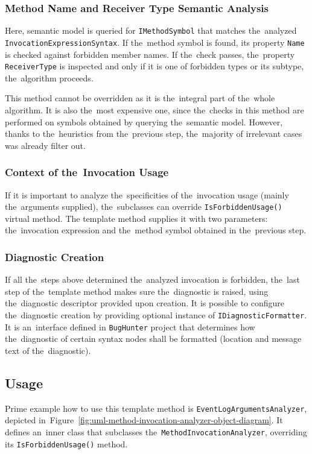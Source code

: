 \documentclass[
  digital, %
  table,   %
  lof,     %
  lot,     %
  oneside,
]{fithesis3}
\begin{document}

\subsubsection{Method Name and Receiver Type Semantic Analysis}
Here, semantic model is queried for \texttt{IMethodSymbol} that matches the~analyzed \texttt{InvocationExpressionSyntax}. If the~method symbol is found, its property \texttt{Name} is checked against forbidden member names. If the~check passes, the~property \texttt{ReceiverType} is inspected and only if it is one of forbidden types or its subtype, the~algorithm proceeds. 

This method cannot be overridden as it is the~integral part of the~whole algorithm. It is also the~most expensive one, since the~checks in this method are performed on symbols obtained by querying the~semantic model. However, thanks to the~heuristics from the~previous step, the~majority of irrelevant cases was already filter out.

\subsubsection{Context of the~Invocation Usage}
If it is important to analyze the~specificities of the~invocation usage (mainly the~arguments supplied), the~subclasses can override \texttt{IsForbiddenUsage()} virtual method. The template method supplies it with two parameters: the~invocation expression and the~method symbol obtained in the~previous step.

\subsubsection{Diagnostic Creation}
If all the~steps above determined the~analyzed invocation is forbidden, the~last step of the~template method makes sure the~diagnostic is raised, using the~diagnostic descriptor provided upon creation. It is possible to configure the~diagnostic creation by providing optional instance of \texttt{IDiagnosticFormatter}. It is an~interface defined in \texttt{BugHunter} project that determines how the~diagnostic of certain syntax nodes shall be formatted (location and message text of the~diagnostic).

\subsection{Usage}
\label{sec:method-invocation-analyzer-usage}
Prime example how to use this template method is \texttt{EventLogArgumentsAnalyzer}, depicted in~Figure~\ref{fig:uml-method-invocation-analyzer-object-diagram}. It defines an~inner class that subclasses the~\texttt{MethodInvocationAnalyzer}, overriding its \texttt{IsForbiddenUsage()} method.
\end{document}
